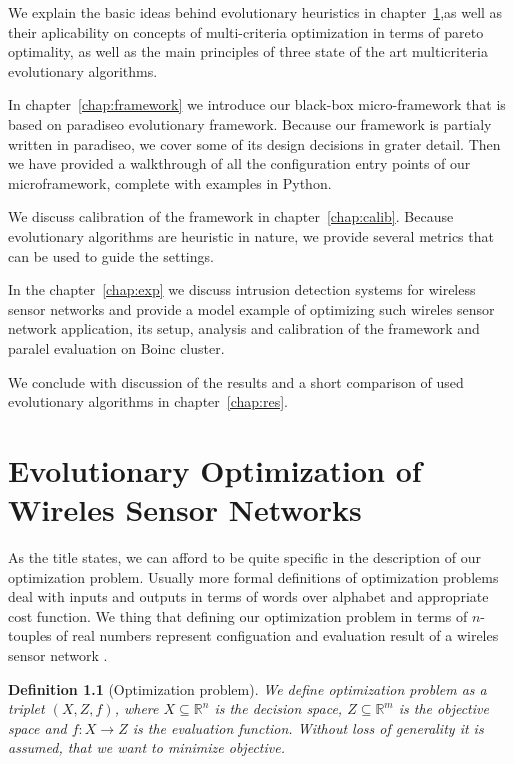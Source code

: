 \documentclass[12pt,oneside]{fithesis2}
\newtheorem{defn}{Definition}
\begin{document}
We explain the basic ideas behind evolutionary heuristics in chapter~\ref{chap:evolution},as well as their aplicability on concepts of multi-criteria optimization in terms of pareto optimality, as well as the main principles of three state of the art multicriteria evolutionary algorithms. 

In chapter~\ref{chap:framework} we introduce our black-box micro-framework that is based on paradiseo evolutionary framework. Because our framework is partialy written in paradiseo, we cover some of its design decisions in grater detail. Then we have provided a walkthrough of all the configuration entry points of our microframework, complete with examples in Python.

We discuss calibration of the framework in chapter~\ref{chap:calib}. Because evolutionary algorithms are heuristic in nature, we provide several metrics that can be used to guide the settings. 

In the chapter~\ref{chap:exp} we discuss intrusion detection systems for wireless sensor networks and provide a model example of optimizing such wireles sensor network application, its setup, analysis and calibration of the framework and paralel evaluation on Boinc cluster.

We conclude with discussion of the results and a short comparison of used evolutionary algorithms in chapter~\ref{chap:res}.

\chapter{Evolutionary Optimization of Wireles Sensor Networks}
\label{chap:evolution}
As the title states, we can afford to be quite specific in the description of our optimization problem. Usually more formal definitions of optimization problems deal with inputs and outputs in terms of words over alphabet and appropriate cost function. We thing that defining our optimization problem in terms of $n$-touples of real numbers represent configuation and evaluation result of a wireles sensor network . 

\begin{defn}[Optimization problem]
We define optimization problem as a triplet $(X,Z,f)$,
 where $X \subseteq \mathbb{R}^n$ is the decision space,
$Z \subseteq \mathbb{R}^m$ is the objective space and $f:X \to Z$ is the evaluation function.
Without loss of generality it is assumed, that we want to minimize objective.
\end{defn}
\end{document}
